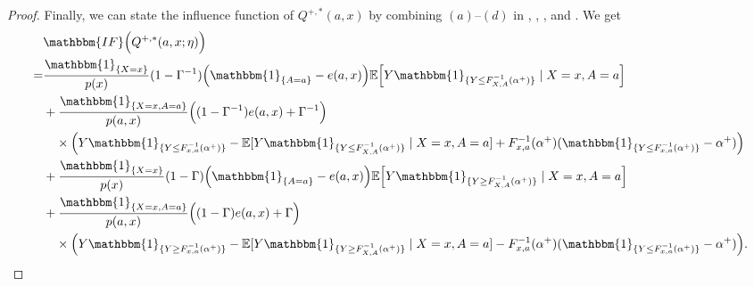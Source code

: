 \documentclass{article} %
\theoremstyle{plain}
\theoremstyle{definition}
\theoremstyle{remark}
\newcommand{\q}{F_{x,a}^{-1}}
\newcommand{\Q}{F_{X,A}^{-1}}
\newcommand{\Indl}{\mathbbm{1}_{\{Y\leq \q({\alpha^+})\}}}
\newcommand{\Indg}{\mathbbm{1}_{\{Y\geq \q({\alpha^+})\}}}
\newcommand{\IndL}{\mathbbm{1}_{\{Y\leq \Q({\alpha^+})\}}}
\newcommand{\IndG}{\mathbbm{1}_{\{Y\geq \Q({\alpha^+})\}}}
\newcommand{\f}{\mathbbm{IF}}
\begin{document}
\begin{proof}
Finally, we can state the influence function of $Q^{+,*}(a,x)$ by combining $(a)$--$(d)$ in , , , and . We get  
\begin{align}
    &\f \Big( Q^{+,*}(a,x;\eta) \Big)\\
    =&  \frac{\mathbbm{1}_{\{X=x\}}}{p(x)}(1-\Gamma^{-1})\Big( \mathbbm{1}_{\{A=a\}}-e(a, x)\Big)
       \mathbb{E}\Big[ Y \IndL \mid X=x, A=a \Big]\\
    &+ \frac{\mathbbm{1}_{\{X=x,A=a\}}}{p(a,x)} \Big( (1-\Gamma^{-1}) e(a, x) +\Gamma^{-1} \Big)\\
    & \quad \times  \Big(  Y\Indl
    - \mathbb{E}[Y\IndL \mid X=x,A=a] +\q({\alpha^+})(\mathbbm{1}_{\{Y\leq \q({\alpha^+})\}} - {\alpha^+})\Big)\\
    &+ \frac{\mathbbm{1}_{\{X=x\}}}{p(x)}(1-\Gamma) \Big( \mathbbm{1}_{\{A=a\}}-e(a, x)\Big)
        \mathbb{E}\Big[ Y \IndG \mid X=x, A=a \Big] \\
    &+  \frac{\mathbbm{1}_{\{X=x,A=a\}}}{p(a,x)} \Big( (1-\Gamma) e(a, x) +\Gamma \Big) \\
    & \quad \times  \Big(  Y\Indg 
    - \mathbb{E}[Y\IndG \mid X=x,A=a] -\q({\alpha^+})(\mathbbm{1}_{\{Y\leq \q({\alpha^+})\}} - {\alpha^+})\Big).\label{eq:if_capo_0}
\end{align}


\end{proof}
\end{document}
